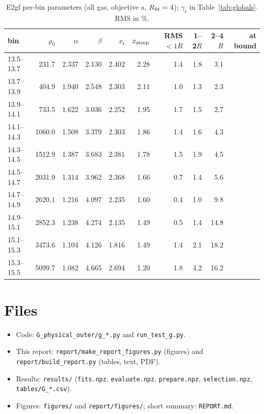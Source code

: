 \documentclass[10pt,a4paper]{article}
\begin{document}
\begin{table}[H]
\centering
\footnotesize
\caption{E2gf per-bin parameters (all gas, objective a, $R_{\rm fit}=4$); $\gamma_t$ in Table~\ref{tab:globals}. RMS in \%.}
\label{tab:E2gfbins}
\begin{tabular}{lrrrrrrrrr}
\toprule
bin & $\rho_0$ & $\alpha$ & $\beta$ & $x_t$ & $x_{\rm steep}$ & RMS $<1R$ & 1--2$R$ & 2--4$R$ & at bound \\
\midrule
13.5--13.7 & 231.7 & 2.337 & 2.130 & 2.402 & 2.28 & 1.4 & 1.8 & 3.1 &  \\
13.7--13.9 & 404.9 & 1.940 & 2.548 & 2.303 & 2.11 & 1.0 & 1.3 & 2.3 &  \\
13.9--14.1 & 733.5 & 1.622 & 3.036 & 2.252 & 1.95 & 1.7 & 1.5 & 2.7 &  \\
14.1--14.3 & 1060.0 & 1.508 & 3.379 & 2.303 & 1.86 & 1.4 & 1.6 & 4.3 &  \\
14.3--14.5 & 1512.9 & 1.387 & 3.683 & 2.381 & 1.78 & 1.5 & 1.9 & 4.5 &  \\
14.5--14.7 & 2031.9 & 1.314 & 3.962 & 2.368 & 1.66 & 0.7 & 1.4 & 5.6 &  \\
14.7--14.9 & 2620.1 & 1.216 & 4.097 & 2.235 & 1.60 & 0.4 & 1.0 & 9.8 &  \\
14.9--15.1 & 2852.3 & 1.238 & 4.274 & 2.135 & 1.49 & 0.5 & 1.4 & 14.8 &  \\
15.1--15.3 & 3473.6 & 1.104 & 4.126 & 1.816 & 1.49 & 1.4 & 2.1 & 18.2 &  \\
15.3--15.5 & 5099.7 & 1.082 & 4.665 & 2.694 & 1.20 & 1.8 & 4.2 & 16.2 &  \\
\bottomrule
\end{tabular}
\end{table}

\section{Files}
\begin{itemize}
\item Code: \texttt{G\_physical\_outer/g\_*.py} and \texttt{run\_test\_g.py}.
\item This report: \texttt{report/make\_report\_figures.py} (figures) and \texttt{report/build\_report.py} (tables, text,
  PDF).
\item Results: \texttt{results/} (\texttt{fits.npz}, \texttt{evaluate.npz}, \texttt{prepare.npz}, \texttt{selection.npz},
  \texttt{tables/G\_*.csv}).
\item Figures: \texttt{figures/} and \texttt{report/figures/}; short summary: \texttt{REPORT.md}.
\end{itemize}
\end{document}
